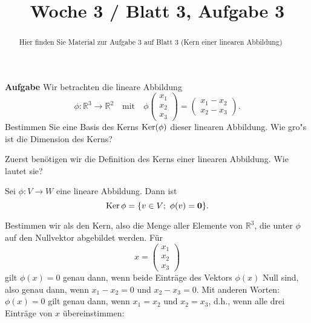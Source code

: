 \documentclass{ximera}
\title{Woche 3 / Blatt 3, Aufgabe 3}
\begin{document}
\begin{abstract}
Hier finden Sie Material zur Aufgabe 3 auf Blatt 3 (Kern einer linearen Abbildung)
\end{abstract}
\maketitle

\textbf{Aufgabe}
Wir betrachten die lineare Abbildung
\[ \phi: \mathbb R^3 \to \mathbb R^2 \quad \mbox{mit} \quad
\phi \left(\begin{array}{c}
x_1\\x_2\\x_3 
\end{array}  \right) = 
\left( \begin{array}{c}
   x_1-x_2\\x_2-x_3 
\end{array}   \right). \]
Bestimmen Sie eine Basis des Kerns $\mathop{\rm Ker}(\phi)$ dieser linearen
Abbildung. Wie gro"s ist die Dimension des Kerns?


\begin{question}
Zuerst benötigen wir die Definition des Kerns einer linearen Abbildung. Wie lautet sie?
\begin{solution}
    \begin{free-response}
        Sei $\phi\colon V \rightarrow W$ eine lineare Abbildung. Dann ist 
\[
\mathop{\rm Ker} \phi = \{ v\in V;\ \phi(v) = \mathbf{0} \}.
\]
    \end{free-response}
\end{solution}
\end{question}


Bestimmen wir als den Kern, also die Menge aller Elemente von $\mathbb R^3$, die unter $\phi$ auf den Nullvektor abgebildet werden. Für 
\[
x= \left(\begin{array}{c}
x_1\\x_2\\x_3 
\end{array}  \right)
\]
gilt $\phi(x) = 0$ genau dann, wenn beide Einträge des Vektors $\phi(x)$ Null sind, also genau dann, wenn  $x_1 - x_2 = 0$ und $x_2 - x_3 = 0$. Mit anderen Worten: $\phi(x) = 0$ gilt genau dann, wenn $x_1 = x_2$ und $x_2 = x_3$, d.h., wenn alle drei Einträge von $x$ übereinstimmen:
\end{document}
